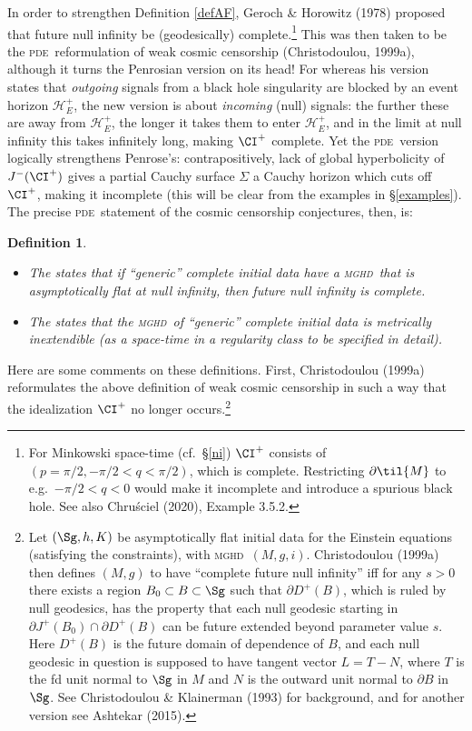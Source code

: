 \documentclass[11pt,a4paper]{article}
\newcommand{\mghd}{\textsc{mghd}}
\newcommand{\pde}{\textsc{pde}}
\newcommand{\p}{\partial}
\newtheorem{definition}[theorem]{Definition}
\begin{document}
 In order  to 
 strengthen Definition \ref{defAF}, Geroch \& Horowitz (1978) proposed  that  future null infinity be (geodesically) complete.\footnote{For Minkowski space-time (cf.\ \S\ref{ni})
 $\CI^+$ consists of $(p=\pi/2,-\pi/2<q<\pi/2)$, which is complete. Restricting $\p\til{M}$ to e.g.\ $-\pi/2<q<0$ would  make it incomplete and introduce a spurious black hole. See also  Chru\'{s}ciel (2020), Example 3.5.2.}  This was then taken to be the 
 \pde\ reformulation of weak cosmic censorship  (Christodoulou, 1999a), although it turns the  Penrosian version on its head! For whereas his version states that \emph{outgoing} signals from a black hole singularity are blocked by an event horizon $\mathcal{H}^+_E$, the new version is about \emph{incoming} (null) signals: the further these are away from $\mathcal{H}^+_E$, the longer it takes them to enter $\mathcal{H}^+_E$, and in the limit at null infinity this takes infinitely long, making $\CI^+$ complete. 
Yet the \pde\ version logically strengthens Penrose's: 
 contrapositively,  lack of global hyperbolicity of $J^-(\CI^+)$ gives a partial Cauchy surface $\Sigma$ a Cauchy horizon which cuts off
 $\CI^+$, making it incomplete (this will be clear from the examples in \S\ref{examples}). 
 The precise \pde\ statement of the cosmic censorship conjectures, then, is:
\begin{definition}\label{CSfed1}
\begin{itemize}
\item The  states that if ``generic'' complete initial data have a \mghd\ that is asymptotically flat at null infinity, then  future null infinity is  complete.
\item The  states that the \mghd\ of ``generic'' complete initial data  is metrically inextendible (as a space-time in a regularity class to be specified in detail).\end{itemize}
\end{definition}
Here are some comments on these definitions. First, 
 Christodoulou (1999a) reformulates the above definition of weak cosmic censorship in such a way that the idealization $\CI^+$ no longer occurs.\footnote{
 Let $(\Sg,h,K)$ be asymptotically flat initial data for the Einstein equations (satisfying the constraints),  with \mghd\ $(M,g,i)$.
   Christodoulou (1999a) then defines $(M,g)$  to have ``complete future null infinity'' iff for any $s>0$ there exists a region $B_0\subset B\subset\Sg$ such that $\p D^+(B)$, which is ruled by null geodesics, has the property that each null geodesic starting 
 in $\p J^+(B_0)\cap \p D^+(B)$ can be future extended beyond parameter value  $s$. 
 Here $D^+(B)$ is the future domain of dependence of $B$,  and each null geodesic in question is supposed to have tangent vector $L=T-N$, where $T$ is the fd unit normal to $\Sg$ in $M$ and $N$ is the outward unit normal to $\p B$ in $\Sg$.
 See Christodoulou \& Klainerman (1993) for background, and
 for  another version see Ashtekar (2015). }
\end{document}
